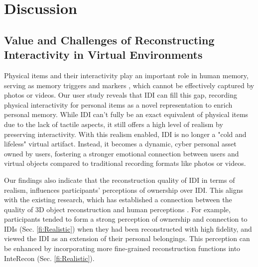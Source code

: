 \section{Discussion}
\subsection{Value and Challenges of Reconstructing Interactivity in Virtual Environments}
Physical items and their interactivity play an important role in human memory, serving as memory triggers and markers \cite{10.1145/1806923.1806924,petrelli2010family,10.1145/3024969.3024996}, which cannot be effectively captured by photos or videos. 
Our user study reveals that IDI can fill this gap, recording physical interactivity for personal items as a novel representation to enrich personal memory.
While IDI can't fully be an exact equivalent of physical items due to the lack of tactile aspects, it still offers a high level of realism by preserving interactivity. 
With this realism enabled, IDI is no longer a "cold and lifeless" virtual artifact.
Instead, it becomes a dynamic, cyber personal asset owned by users, fostering a stronger emotional connection between users and virtual objects compared to traditional recording formats like photos or videos.

Our findings also indicate that the reconstruction quality of IDI in terms of realism, influences participants' perceptions of ownership over IDI.
This aligns with the existing research, which has established a connection between the quality of 3D object reconstruction and human perceptions \cite{scarfe2015using, crete2012reconstructing, 10.1145/1518701.1518966}.
For example, participants tended to form a strong perception of ownership and connection to IDIs (Sec. \ref{fi:Realistic}) when they had been reconstructed with high fidelity, and viewed the IDI as an extension of their personal belongings.
This perception can be enhanced by incorporating more fine-grained reconstruction functions into InteRecon (Sec. \ref{fi:Realistic}).


